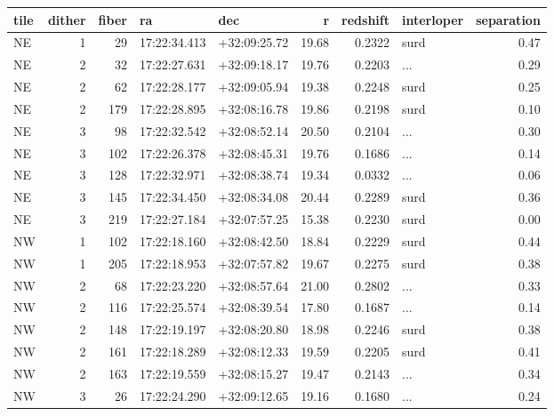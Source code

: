 \begin{tabular}{lrrllrrlr}
\toprule
tile &  dither &  fiber &            ra &           dec &      r &  redshift & interloper &  separation \\
\midrule
  NE &       1 &     29 &  17:22:34.413 &  +32:09:25.72 &  19.68 &    0.2322 &       surd &        0.47 \\
  NE &       2 &     32 &  17:22:27.631 &  +32:09:18.17 &  19.76 &    0.2203 &        ... &        0.29 \\
  NE &       2 &     62 &  17:22:28.177 &  +32:09:05.94 &  19.38 &    0.2248 &       surd &        0.25 \\
  NE &       2 &    179 &  17:22:28.895 &  +32:08:16.78 &  19.86 &    0.2198 &       surd &        0.10 \\
  NE &       3 &     98 &  17:22:32.542 &  +32:08:52.14 &  20.50 &    0.2104 &        ... &        0.30 \\
  NE &       3 &    102 &  17:22:26.378 &  +32:08:45.31 &  19.76 &    0.1686 &        ... &        0.14 \\
  NE &       3 &    128 &  17:22:32.971 &  +32:08:38.74 &  19.34 &    0.0332 &        ... &        0.06 \\
  NE &       3 &    145 &  17:22:34.450 &  +32:08:34.08 &  20.44 &    0.2289 &       surd &        0.36 \\
  NE &       3 &    219 &  17:22:27.184 &  +32:07:57.25 &  15.38 &    0.2230 &       surd &        0.00 \\
  NW &       1 &    102 &  17:22:18.160 &  +32:08:42.50 &  18.84 &    0.2229 &       surd &        0.44 \\
  NW &       1 &    205 &  17:22:18.953 &  +32:07:57.82 &  19.67 &    0.2275 &       surd &        0.38 \\
  NW &       2 &     68 &  17:22:23.220 &  +32:08:57.64 &  21.00 &    0.2802 &        ... &        0.33 \\
  NW &       2 &    116 &  17:22:25.574 &  +32:08:39.54 &  17.80 &    0.1687 &        ... &        0.14 \\
  NW &       2 &    148 &  17:22:19.197 &  +32:08:20.80 &  18.98 &    0.2246 &       surd &        0.38 \\
  NW &       2 &    161 &  17:22:18.289 &  +32:08:12.33 &  19.59 &    0.2205 &       surd &        0.41 \\
  NW &       2 &    163 &  17:22:19.559 &  +32:08:15.27 &  19.47 &    0.2143 &        ... &        0.34 \\
  NW &       3 &     26 &  17:22:24.290 &  +32:09:12.65 &  19.16 &    0.1680 &        ... &        0.24 \\

\end{tabular}
